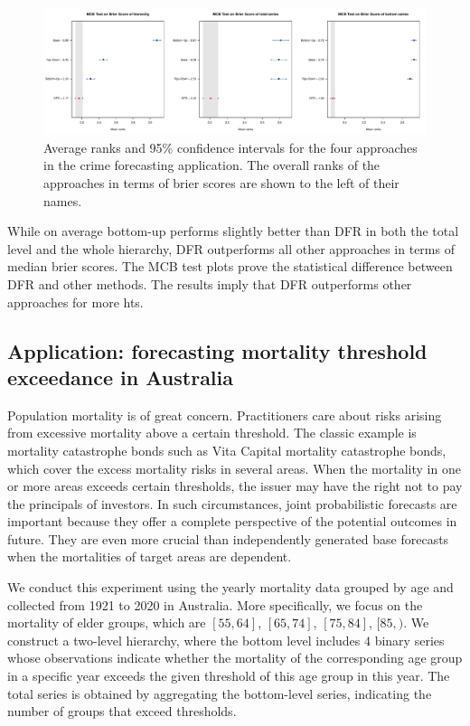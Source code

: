 \documentclass[a4paper,review,12pt,authoryear]{elsarticle}
\begin{document}
     \begin{figure}[h]
       \caption{\label{fig:application_crime}Average ranks and 95\% confidence intervals for the four approaches in the crime forecasting application. The overall ranks of the approaches in terms of brier scores are shown to the left of their names.}
       \centering
       \includegraphics[width=\textwidth]{figures/dc_crime_bs.pdf}
     \end{figure}
     
     While on average bottom-up performs slightly better than DFR in both the total level and the whole hierarchy, DFR outperforms all other approaches in terms of median brier scores.
     The MCB test plots prove the statistical difference between DFR and other methods. 
     The results imply that DFR outperforms other approaches for more hts.
     
     \subsection{Application: forecasting mortality threshold exceedance in Australia}
     \label{sec:application_mortality}
     Population mortality is of great concern. 
     Practitioners care about risks arising from excessive mortality above a certain threshold. 
     The classic example is mortality catastrophe bonds such as Vita Capital mortality catastrophe bonds, which cover the excess mortality risks in several areas.
     When the mortality in one or more areas exceeds certain thresholds, the issuer may have the right not to pay the principals of investors.
     In such circumstances, joint probabilistic forecasts are important because they offer a complete perspective of the potential outcomes in future.
     They are even more crucial than independently generated base forecasts when the mortalities of target areas are dependent.
     
     We conduct this experiment using the yearly mortality data grouped by age and collected from 1921 to 2020 in Australia.
     More specifically, we focus on the mortality of elder groups, which are $[55, 64]$, $[65, 74]$, $[75, 84]$, $[85, )$. 
     We construct a two-level hierarchy, where the bottom level includes 
     $4$ binary series whose observations indicate whether the mortality of the corresponding age group in a specific year exceeds the given threshold of this age group in this year.
     The total series is obtained by aggregating the bottom-level series, indicating the number of groups that exceed thresholds.
     
\end{document}
